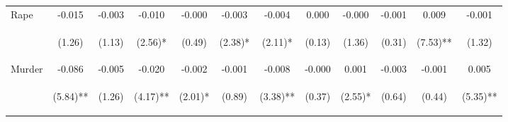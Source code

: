 \begin{tabular}{lccccccccccc}
\noalign{\smallskip}Rape & -0.015 & -0.003 & -0.010 & -0.000 & -0.003 & -0.004 & 0.000 & -0.000 & -0.001 & 0.009 & -0.001\\
 & \begin{footnotesize}(1.26)\end{footnotesize} & \begin{footnotesize}(1.13)\end{footnotesize} & \begin{footnotesize}(2.56)*\end{footnotesize} & \begin{footnotesize}(0.49)\end{footnotesize} & \begin{footnotesize}(2.38)*\end{footnotesize} & \begin{footnotesize}(2.11)*\end{footnotesize} & \begin{footnotesize}(0.13)\end{footnotesize} & \begin{footnotesize}(1.36)\end{footnotesize} & \begin{footnotesize}(0.31)\end{footnotesize} & \begin{footnotesize}(7.53)**\end{footnotesize} & \begin{footnotesize}(1.32)\end{footnotesize}\\
\noalign{\smallskip}Murder & -0.086 & -0.005 & -0.020 & -0.002 & -0.001 & -0.008 & -0.000 & 0.001 & -0.003 & -0.001 & 0.005\\
 & \begin{footnotesize}(5.84)**\end{footnotesize} & \begin{footnotesize}(1.26)\end{footnotesize} & \begin{footnotesize}(4.17)**\end{footnotesize} & \begin{footnotesize}(2.01)*\end{footnotesize} & \begin{footnotesize}(0.89)\end{footnotesize} & \begin{footnotesize}(3.38)**\end{footnotesize} & \begin{footnotesize}(0.37)\end{footnotesize} & \begin{footnotesize}(2.55)*\end{footnotesize} & \begin{footnotesize}(0.64)\end{footnotesize} & \begin{footnotesize}(0.44)\end{footnotesize} & \begin{footnotesize}(5.35)**\end{footnotesize}\\

\end{tabular}
